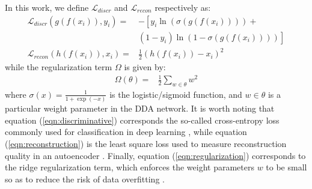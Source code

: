 In this work, we define $\mathcal{L}_{discr}$ and $\mathcal{L}_{recon}$ respectively as:
\begin{align}
\label{eqn:discriminative}
\mathcal{L}_{discr}(g(f(x_i)), y_i) = &-\left[ y_i \ln\left( \sigma(g(f(x_i))) \right) \right. + \nonumber\\
                                       &\left. (1 - y_i) \ln\left( 1 - \sigma(g(f(x_i))) \right)  \right]\\
\label{eqn:reconstruction}
\mathcal{L}_{recon}(h(f(x_i)), x_i) = &\frac{1}{2} \left( h(f(x_i)) - x_i \right)^2
\end{align}
while the regularization term $\Omega$ is given by:
\begin{align}
\label{eqn:regularization}
\Omega(\theta) = &\frac{1}{2} \sum_{w \in \theta} w^2 
\end{align}
where $\sigma(x) = \frac{1}{1 + \exp(-x)}$ is the logistic/sigmoid function, and $w \in \theta$ is a particular weight parameter in the DDA network. It is worth noting that equation (\ref{eqn:discriminative}) corresponds the so-called cross-entropy loss commonly used for classification in deep learning \cite{Rosasco2004}, while equation (\ref{eqn:reconstruction}) is the least square loss used to measure reconstruction quality in an autoencoder \cite{Vincent2010}. Finally, equation (\ref{eqn:regularization}) corresponds to the ridge regularization term, which enforces the weight parameters $w$ to be small so as to reduce the risk of data overfitting \cite{}. 


